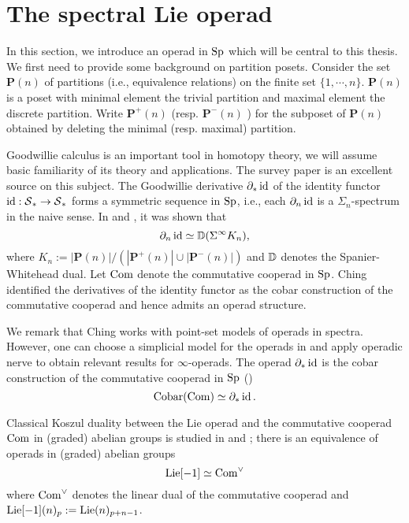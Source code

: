 \section{The spectral Lie operad}
\label{The spectral Lie operad}
In this section, we introduce an operad in $\operatorname{Sp}$ which will be central to this thesis. 
We first need to provide some background on partition posets. 
Consider the set $\mathbf{P}(n)$ of partitions (i.e., equivalence relations) on the finite set $\{1, \cdots, n \}$. $\mathbf{P}(n)$ is a poset with minimal element the trivial partition and maximal element the discrete partition.
Write $\mathbf{P}^{+}(n)$ (resp. $\mathbf{P}^{-}(n)$ ) for the subposet of $\mathbf{P}(n)$ obtained by deleting the minimal (resp. maximal) partition.

    Goodwillie calculus is an important tool in homotopy theory, we will assume basic familiarity of its theory and applications. The survey paper \cite{Aone-Ching_Survey} is an excellent source on this subject.
	The Goodwillie derivative $\partial_* \operatorname{id}$ of the identity functor $\operatorname{id}: \operatorname{\mathcal{S}}_* \to \operatorname{\mathcal{S}}_*$ forms a symmetric sequence in $\operatorname{Sp}$, i.e., each $\partial_n \operatorname{id}$ is a $\Sigma_n$-spectrum in the naive sense. In \cite{JohnsonDerivative} and \cite{Arone-Mahowald}, it was shown that
	$$
	\partial_n \operatorname{id} \simeq {\mathbb{D}}(\Sigma^{\infty} K_n),
	$$
	where 
	$
	K_{n}:=|\mathbf{P}(n)| /\left(\left|\mathbf{P}^{+}(n)\right| \cup\left|\mathbf{P}^{-}(n)\right|\right)
	$
	and ${\mathbb{D}}$ denotes the Spanier-Whitehead dual. 
	Let $\operatorname{Com}$ denote the commutative cooperad in $\operatorname{Sp}$.
	Ching \cite{ChingBar} identified the derivatives of the identity functor as the cobar construction of the commutative cooperad and hence admits an operad structure.
	\begin{remark}
	We remark that Ching works with point-set models of operads in spectra. However, one can choose a simplicial model for the operads in \cite{Ching_Bar-cobar} and apply operadic nerve \cite[Definition 2.1.1.23.]{HA}
	to obtain relevant results for $\infty$-operads.
	The operad $\partial_* \operatorname{id}$ is the cobar construction of the commutative cooperad in $\operatorname{Sp}$ (\cite[Remark 8.9]{ChingBar})
	$$
	\operatorname{Cobar}(\operatorname{Com})\simeq \partial_* \operatorname{id}.
	$$
	\end{remark}
	
	\begin{remark}
    Classical Koszul duality between the Lie operad and the commutative cooperad $\operatorname{Com}$ in (graded) abelian groups is studied in \cite{Ginzburg-Kapranov} and \cite{Loday-Vallette};
    there is an equivalence of operads in (graded) abelian groups
    \[
    \operatorname{Lie}[-1] \simeq \operatorname{Com}^{\vee}
    \]
    where $\operatorname{Com}^{\vee}$ denotes the linear dual of the commutative cooperad and $\operatorname{Lie}[-1](n)_p:=\operatorname{Lie}(n)_{p+n-1}$.
    \end{remark}
    
